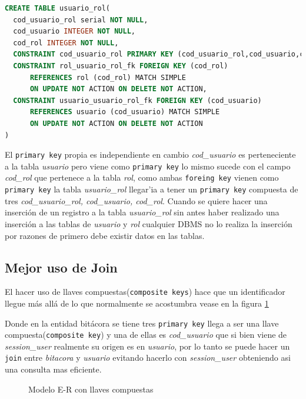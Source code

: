 \begin{lstlisting}[caption={SQL tabla usuario\_rol},label={SQLtablaUsuarioRolComposite},language=sql]
CREATE TABLE usuario_rol(
  cod_usuario_rol serial NOT NULL,
  cod_usuario INTEGER NOT NULL,
  cod_rol INTEGER NOT NULL,
  CONSTRAINT cod_usuario_rol PRIMARY KEY (cod_usuario_rol,cod_usuario,cod_rol),
  CONSTRAINT rol_usuario_rol_fk FOREIGN KEY (cod_rol)
      REFERENCES rol (cod_rol) MATCH SIMPLE
      ON UPDATE NOT ACTION ON DELETE NOT ACTION,
  CONSTRAINT usuario_usuario_rol_fk FOREIGN KEY (cod_usuario)
      REFERENCES usuario (cod_usuario) MATCH SIMPLE
      ON UPDATE NOT ACTION ON DELETE NOT ACTION
)
\end{lstlisting}
El \texttt{primary key} propia es independiente en cambio \textit{cod\_usuario} es perteneciente a la tabla \textit{usuario} pero viene como \texttt{primary key} lo mismo sucede con el campo \textit{cod\_rol}  que pertenece a la tabla \textit{rol}, como ambas \texttt{foreing key} vienen como \texttt{primary key} la tabla \textit{usuario\_rol} llegar'ia a tener un \texttt{primary key} compuesta de tres \textit{cod\_usuario\_rol, cod\_usuario, cod\_rol}. Cuando se quiere hacer una inserci\'on de un registro a la tabla \textit{usuario\_rol} sin antes haber realizado una inserci\'on a las tablas de \textit{usuario} y \textit{rol} cualquier DBMS no lo realiza la inserci\'on por razones de primero debe existir datos en las tablas.
\subsection{Mejor uso de Join}
El hacer uso de llaves compuestas(\texttt{composite keys}) hace que un identificador llegue m\'as all\'a de lo que normalmente se acostumbra vease en la figura  \ref{fig:llavesCompuestas}

Donde en la entidad bit\'acora se tiene tres \texttt{primary key} llega a ser una llave compuesta(\texttt{composite key}) y una de ellas es \textit{cod\_usuario} que si bien viene de \textit{session\_user} realmente su origen es en \textit{usuario}, por lo tanto se puede hacer un \texttt{join} entre \textit{bitacora} y \textit{usuario} evitando hacerlo con \textit{session\_user} obteniendo asi una consulta mas eficiente.
\begin{figure}[H]
\centering
{}
\caption{Modelo E-R con llaves compuestas} \label{fig:llavesCompuestas}
\end{figure}
